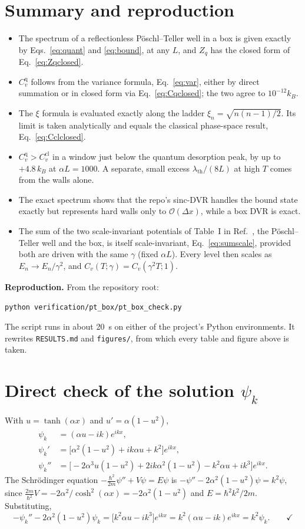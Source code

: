 \documentclass[11pt]{article}
\numberwithin{equation}{section}
\newcommand{\lth}{\lambda_{\mathrm{th}}}
\newcommand{\Cq}{C_v^{\mathrm{q}}}
\newcommand{\Ccl}{C_v^{\mathrm{cl}}}
\newcommand{\kB}{k_{B}}
\begin{document}
\section{Summary and reproduction}
\begin{itemize}[itemsep=2pt]
\item The spectrum of a reflectionless P\"oschl--Teller well in a box is given exactly by Eqs.~\eqref{eq:quant} and \eqref{eq:bound}, at any $L$, and $Z_q$ has the closed form of Eq.~\eqref{eq:Zqclosed}.
\item $\Cq$ follows from the variance formula, Eq.~\eqref{eq:var}, either by direct summation or in closed form via Eq.~\eqref{eq:Cqclosed}; the two agree to $10^{-12}\kB$.
\item The $\xi$ formula is evaluated exactly along the ladder $\xi_n=\sqrt{n(n-1)/2}$. Its limit is taken analytically and equals the classical phase-space result, Eq.~\eqref{eq:Cclclosed}.
\item $\Cq>\Ccl$ in a window just below the quantum desorption peak, by up to $+4.8\,\kB$ at $\alpha L=1000$. A separate, small excess $\lth/(8L)$ at high $T$ comes from the walls alone.
\item The exact spectrum shows that the repo's sinc-DVR handles the bound state exactly but represents hard walls only to $\mathcal O(\Delta x)$, while a box DVR is exact.
\item The sum of the two scale-invariant potentials of Table~I in Ref.~\cite{deffner2014}, the P\"oschl--Teller well and the box, is itself scale-invariant, Eq.~\eqref{eq:sumscale}, provided both are driven with the same $\gamma$ (fixed $\alpha L$). Every level then scales as $E_n\to E_n/\gamma^2$, and $C_v(T;\gamma)=C_v(\gamma^2T;1)$.
\end{itemize}
\noindent\textbf{Reproduction.} From the repository root:
\begin{center}
\texttt{python verification/pt\_box/pt\_box\_check.py}
\end{center}
The script runs in about 20~s on either of the project's Python environments. It rewrites \texttt{RESULTS.md} and \texttt{figures/}, from which every table and figure above is taken.

\appendix
\section{Direct check of the solution \texorpdfstring{$\psi_k$}{psi\_k}}
\label{app:check}
With $u=\tanh(\alpha x)$ and $u'=\alpha(1-u^2)$,
\begin{align*}
\psi_k&=(\alpha u-ik)e^{ikx},\\
\psi_k'&=\big[\alpha^2(1-u^2)+ik\alpha u+k^2\big]e^{ikx},\\
\psi_k''&=\big[-2\alpha^3u(1-u^2)+2ik\alpha^2(1-u^2)-k^2\alpha u+ik^3\big]e^{ikx}.
\end{align*}
The Schr\"odinger equation $-\frac{\hbar^2}{2m}\psi''+V\psi=E\psi$ is $-\psi''-2\alpha^2(1-u^2)\psi=k^2\psi$, since $\frac{2m}{\hbar^2}V=-2\alpha^2/\cosh^2(\alpha x)=-2\alpha^2(1-u^2)$ and $E=\hbar^2k^2/2m$. Substituting,
\[
-\psi_k''-2\alpha^2(1-u^2)\psi_k=\big[k^2\alpha u-ik^3\big]e^{ikx}=k^2(\alpha u-ik)e^{ikx}=k^2\psi_k .\qquad\checkmark
\]
\end{document}
